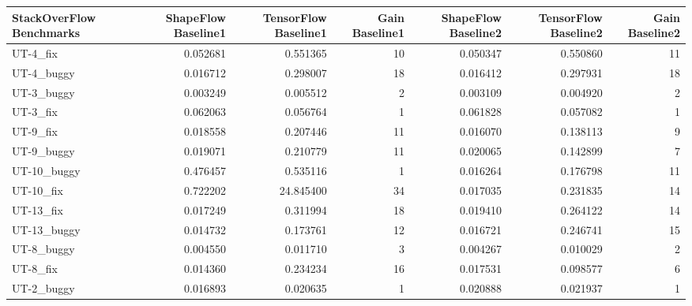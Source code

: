 \documentclass[12pt]{article}
\begin{document}
\begin{tabular}{lrrrrrr}
\toprule
StackOverFlow Benchmarks &  ShapeFlow Baseline1 &  TensorFlow Baseline1 &  Gain Baseline1 &  ShapeFlow Baseline2 &  TensorFlow Baseline2 &  Gain Baseline2 \\
\midrule
 UT-4\_fix    &             0.052681 &              0.551365 &              10 &             0.050347 &              0.550860 &              11 \\
 UT-4\_buggy  &             0.016712 &              0.298007 &              18 &             0.016412 &              0.297931 &              18 \\
 UT-3\_buggy  &             0.003249 &              0.005512 &               2 &             0.003109 &              0.004920 &               2 \\
 UT-3\_fix    &             0.062063 &              0.056764 &               1 &             0.061828 &              0.057082 &               1 \\
 UT-9\_fix    &             0.018558 &              0.207446 &              11 &             0.016070 &              0.138113 &               9 \\
 UT-9\_buggy  &             0.019071 &              0.210779 &              11 &             0.020065 &              0.142899 &               7 \\
 UT-10\_buggy &             0.476457 &              0.535116 &               1 &             0.016264 &              0.176798 &              11 \\
 UT-10\_fix   &             0.722202 &             24.845400 &              34 &             0.017035 &              0.231835 &              14 \\
 UT-13\_fix   &             0.017249 &              0.311994 &              18 &             0.019410 &              0.264122 &              14 \\
 UT-13\_buggy &             0.014732 &              0.173761 &              12 &             0.016721 &              0.246741 &              15 \\
 UT-8\_buggy  &             0.004550 &              0.011710 &               3 &             0.004267 &              0.010029 &               2 \\
 UT-8\_fix    &             0.014360 &              0.234234 &              16 &             0.017531 &              0.098577 &               6 \\
 UT-2\_buggy  &             0.016893 &              0.020635 &               1 &             0.020888 &              0.021937 &               1 \\

\end{tabular}
\end{document}
